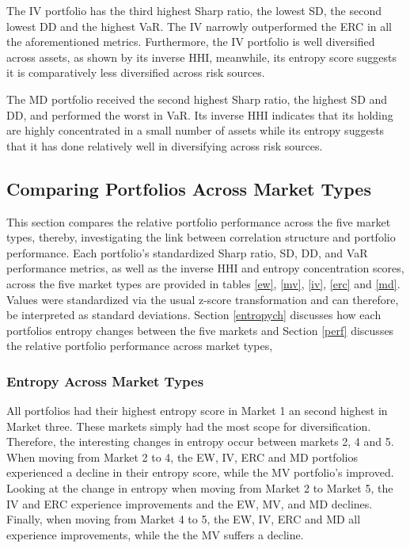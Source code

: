 \documentclass[11pt,preprint, authoryear]{elsarticle}
\numberwithin{equation}{section}
\numberwithin{figure}{section}
\numberwithin{table}{section}
\begin{document}
The IV portfolio has the third highest Sharp ratio, the lowest SD, the
second lowest DD and the highest VaR. The IV narrowly outperformed the
ERC in all the aforementioned metrics. Furthermore, the IV portfolio is
well diversified across assets, as shown by its inverse HHI, meanwhile,
its entropy score suggests it is comparatively less diversified across
risk sources.

The MD portfolio received the second highest Sharp ratio, the highest SD
and DD, and performed the worst in VaR. Its inverse HHI indicates that
its holding are highly concentrated in a small number of assets while
its entropy suggests that it has done relatively well in diversifying
across risk sources.

\hypertarget{comparing-portfolios-across-market-types}{%
\subsection{\texorpdfstring{Comparing Portfolios Across Market Types
\label {cross-market}}{Comparing Portfolios Across Market Types }}\label{comparing-portfolios-across-market-types}}

This section compares the relative portfolio performance across the five
market types, thereby, investigating the link between correlation
structure and portfolio performance. Each portfolio's standardized Sharp
ratio, SD, DD, and VaR performance metrics, as well as the inverse HHI
and entropy concentration scores, across the five market types are
provided in tables \ref{ew}, \ref{mv}, \ref{iv}, \ref{erc} and \ref{md}.
Values were standardized via the usual z-score transformation and can
therefore, be interpreted as standard deviations. Section
\ref{entropych} discusses how each portfolios entropy changes between
the five markets and Section \ref{perf} discusses the relative portfolio
performance across market types,

\hypertarget{entropy-across-market-types}{%
\subsubsection{\texorpdfstring{Entropy Across Market Types
\label{entropych}}{Entropy Across Market Types }}\label{entropy-across-market-types}}

All portfolios had their highest entropy score in Market 1 an second
highest in Market three. These markets simply had the most scope for
diversification. Therefore, the interesting changes in entropy occur
between markets 2, 4 and 5. When moving from Market 2 to 4, the EW, IV,
ERC and MD portfolios experienced a decline in their entropy score,
while the MV portfolio's improved. Looking at the change in entropy when
moving from Market 2 to Market 5, the IV and ERC experience improvements
and the EW, MV, and MD declines. Finally, when moving from Market 4 to
5, the EW, IV, ERC and MD all experience improvements, while the the MV
suffers a decline.
\end{document}
